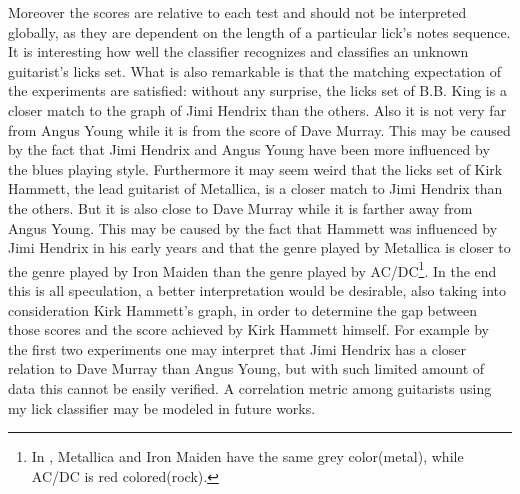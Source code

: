 \documentclass{llncs}
\begin{document}
Moreover the scores are relative to each test and should not be
interpreted globally, as they are dependent on the length of a particular lick's notes sequence.
It is interesting how well the classifier recognizes and classifies an unknown guitarist's 
licks set. What is also remarkable is that the matching expectation of the experiments are 
satisfied: without any surprise, the licks set of B.B. King 
is a closer match to the graph of Jimi Hendrix than the others. Also it is not
very far from Angus Young while it is from the score of Dave Murray.
This may be caused by the fact that Jimi Hendrix and Angus Young have been
more influenced by the blues playing style. Furthermore it may seem
weird that the licks set of Kirk Hammett, the lead guitarist of Metallica, 
is a closer match to Jimi Hendrix than the others. But it is also close to 
Dave Murray while it is farther away from Angus Young. This may be caused by the fact that Hammett was influenced by
Jimi Hendrix in his early years \cite{hammet-hendrix} and that the genre played by Metallica
is closer to the genre played by Iron Maiden than the genre played by
AC/DC\footnote{In \cite{artists-network}, Metallica and Iron Maiden have
the same grey color(metal), while AC/DC is red colored(rock).}. In the end this is all speculation, a better interpretation would be desirable, also taking into consideration 
Kirk Hammett's graph, in order to determine the gap between those
scores and the score achieved by Kirk Hammett himself. For example by the
first two experiments one may interpret that Jimi Hendrix has a closer
relation to Dave Murray than Angus Young, but with such limited amount
of data this cannot be easily verified. A correlation metric among guitarists
using my lick classifier may be modeled in future works.
\end{document}
